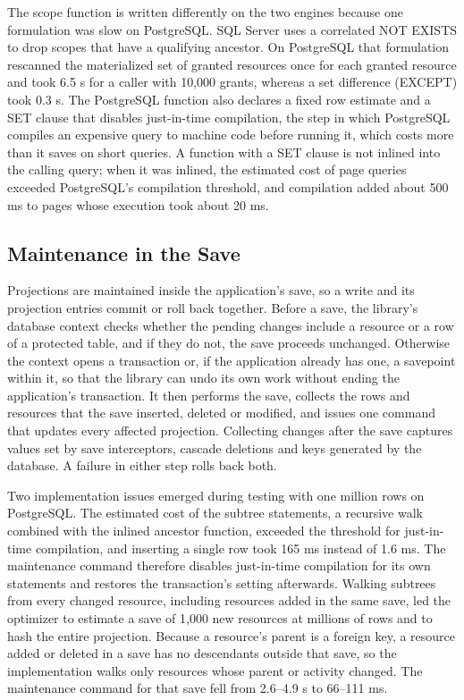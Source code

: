 \documentclass[conference]{IEEEtran}
\begin{document}
The scope function is written differently on the two engines because one formulation was slow on PostgreSQL. SQL Server uses a correlated NOT EXISTS to drop scopes that have a qualifying ancestor. On PostgreSQL that formulation rescanned the materialized set of granted resources once for each granted resource and took 6.5 s for a caller with 10,000 grants, whereas a set difference (EXCEPT) took 0.3 s. The PostgreSQL function also declares a fixed row estimate and a SET clause that disables just-in-time compilation, the step in which PostgreSQL compiles an expensive query to machine code before running it, which costs more than it saves on short queries. A function with a SET clause is not inlined into the calling query; when it was inlined, the estimated cost of page queries exceeded PostgreSQL's compilation threshold, and compilation added about 500 ms to pages whose execution took about 20 ms.

\subsection{Maintenance in the Save}\label{sec-6-3}

Projections are maintained inside the application's save, so a write and its projection entries commit or roll back together. Before a save, the library's database context checks whether the pending changes include a resource or a row of a protected table, and if they do not, the save proceeds unchanged. Otherwise the context opens a transaction or, if the application already has one, a savepoint within it, so that the library can undo its own work without ending the application's transaction. It then performs the save, collects the rows and resources that the save inserted, deleted or modified, and issues one command that updates every affected projection. Collecting changes after the save captures values set by save interceptors, cascade deletions and keys generated by the database. A failure in either step rolls back both.

Two implementation issues emerged during testing with one million rows on PostgreSQL. The estimated cost of the subtree statements, a recursive walk combined with the inlined ancestor function, exceeded the threshold for just-in-time compilation, and inserting a single row took 165 ms instead of 1.6 ms. The maintenance command therefore disables just-in-time compilation for its own statements and restores the transaction's setting afterwards. Walking subtrees from every changed resource, including resources added in the same save, led the optimizer to estimate a save of 1,000 new resources at millions of rows and to hash the entire projection. Because a resource's parent is a foreign key, a resource added or deleted in a save has no descendants outside that save, so the implementation walks only resources whose parent or activity changed. The maintenance command for that save fell from 2.6--4.9 s to 66--111 ms.
\end{document}
